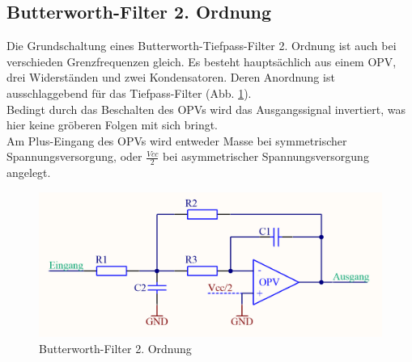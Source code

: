 \subsection{Butterworth-Filter 2. Ordnung}\label{kap:5.1.4}
Die Grundschaltung eines Butterworth-Tiefpass-Filter 2. Ordnung ist auch bei verschieden Grenzfrequenzen gleich. Es besteht hauptsächlich aus einem OPV, drei Widerständen und zwei Kondensatoren. Deren Anordnung ist ausschlaggebend für das Tiefpass-Filter (Abb. \ref{fig:abb5.1.4.1}).\\ 
Bedingt durch das Beschalten des OPVs wird das Ausgangssignal invertiert, was hier keine gröberen Folgen mit sich bringt.\\ 
Am Plus-Eingang des OPVs wird entweder Masse bei symmetrischer Spannungsversorgung, oder $\frac{Vcc}{2}$ bei asymmetrischer Spannungsversorgung angelegt.
\begin{figure} [h]
	\centering
	\includegraphics[width=1\textwidth]{img/Print3/TPFilterButterworth2Ordnung.PNG}
	\caption{Butterworth-Filter 2. Ordnung}
	\label {fig:abb5.1.4.1}
\end{figure}\\

